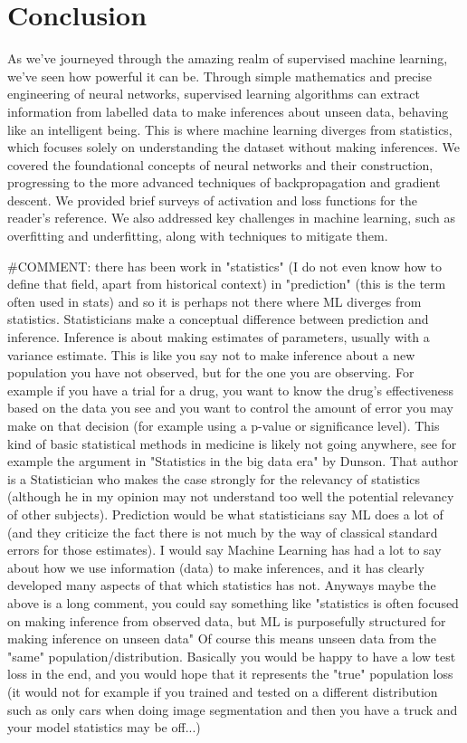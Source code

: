 \documentclass{article}
\begin{document}
    \section{Conclusion}%
    \label{sec:Conclusion}
As we've journeyed through the amazing realm of supervised machine learning, we've seen how powerful it can be. Through simple mathematics and precise engineering of neural networks, supervised learning algorithms can extract information from labelled data to make inferences about unseen data, behaving like an intelligent being. This is where machine learning diverges from statistics, which focuses solely on understanding the dataset without making inferences. We covered the foundational concepts of neural networks and their construction, progressing to the more advanced techniques of backpropagation and gradient descent. We provided brief surveys of activation and loss functions for the reader's reference. We also addressed key challenges in machine learning, such as overfitting and underfitting, along with techniques to mitigate them.

#COMMENT: there has been work in "statistics" (I do not even know how to define that field, apart from historical context) in "prediction" (this is the term often used in stats) and so it is perhaps not there where ML diverges from statistics. Statisticians make a conceptual difference between prediction and inference. Inference is about making estimates of parameters, usually with a variance estimate. This is like you say not to make inference about a new population you have not observed, but for the one you are observing. For example if you have a trial for a drug, you want to know the drug's effectiveness based on the data you see and you want to control the amount of error you may make on that decision (for example using a p-value or significance level). This kind of basic statistical methods in medicine is likely not going anywhere, see for example the argument in "Statistics in the big data era" by Dunson. That author is a Statistician who makes the case strongly for the relevancy of statistics (although he in my opinion may not understand too well the potential relevancy of other subjects). Prediction would be what statisticians say ML does a lot of (and they criticize the fact there is not much by the way of classical standard errors for those estimates). I would say Machine Learning has had a lot to say about how we use information (data) to make inferences, and it has clearly developed many aspects of that which statistics has not. Anyways maybe the above is a long comment, you could say something like "statistics is often focused on making inference from observed data, but ML is purposefully structured for making inference on unseen data" Of course this means unseen data from the "same" population/distribution. Basically you would be happy to have a low test loss in the end, and you would hope that it represents the "true" population loss (it would not for example if you trained and tested on a different distribution such as only cars when doing image segmentation and then you have a truck and your model statistics may be off...) 
\end{document}
